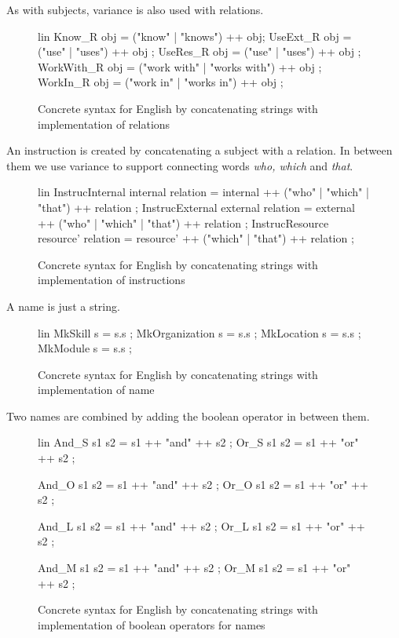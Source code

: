 As with subjects, variance is also used with relations.

\begin{figure}[H]
\begin{code}
lin
 Know_R obj = ("know" | "knows") ++ obj;
 UseExt_R obj = ("use" | "uses") ++ obj ;
 UseRes_R obj = ("use" | "uses") ++ obj ;
 WorkWith_R obj = ("work with" | "works with") ++ obj ;
 WorkIn_R obj = ("work in" | "works in") ++ obj ;
\end{code}
\caption{Concrete syntax for English by concatenating strings with implementation of relations\label{fig:concat-english-relations}}
\end{figure}

An instruction is created by concatenating a subject with a relation. In between them we use variance to support connecting words \emph{who, which} and \emph{that}.

\begin{figure}[H]
\begin{code}
lin
 InstrucInternal internal relation = internal ++ 
                                  ("who" | "which" | "that") ++ relation ;
 InstrucExternal external relation = external ++ 
                                  ("who" | "which" | "that") ++ relation ;
 InstrucResource resource' relation = resource' ++ 
                                  ("which" | "that") ++ relation ;
\end{code}
\caption{Concrete syntax for English by concatenating strings with implementation of instructions\label{fig:concat-english-instrucs}}
\end{figure}

A name is just a string.

\begin{figure}[H]
\begin{code}
lin
 MkSkill s = s.s ;
 MkOrganization s = s.s ;
 MkLocation s = s.s ;
 MkModule s = s.s ;
\end{code}
\caption{Concrete syntax for English by concatenating strings with implementation of name\label{fig:concat-english-names}}
\end{figure}

Two names are combined by adding the boolean operator in between them.

\begin{figure}[H]
\begin{code}
lin
 And_S s1 s2 = s1 ++ "and" ++ s2 ;
 Or_S s1 s2 = s1 ++ "or" ++ s2 ;
	  
 And_O s1 s2 = s1 ++ "and" ++ s2 ;
 Or_O s1 s2 = s1 ++ "or" ++ s2 ;
	  
 And_L s1 s2 = s1 ++ "and" ++ s2 ;
 Or_L s1 s2 = s1 ++ "or" ++ s2 ;
	  
 And_M s1 s2 = s1 ++ "and" ++ s2 ;
 Or_M s1 s2 = s1 ++ "or" ++ s2 ;
\end{code}
\caption{Concrete syntax for English by concatenating strings with implementation of boolean operators for names\label{fig:concat-english-boolean-names}}
\end{figure}

